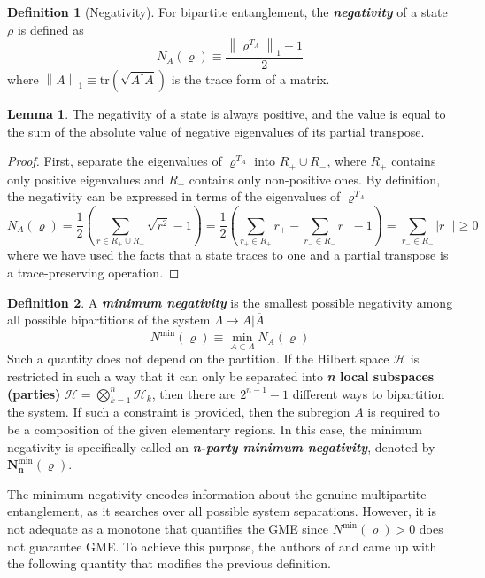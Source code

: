 \documentclass[12font]{article}
\theoremstyle{definition}
\newtheorem{definition}{Definition}[section]
\newtheorem{lemma}[theorem]{Lemma}
\newcommand{\lr}[1]{\left(  #1  \right)}
\newcommand{\abs}[1]{\left|  #1  \right|}
\newcommand{\mrm}[1]{\mathrm{#1}}
\newcommand{\tr}{\mrm{tr}}
\newcommand{\norm}[1]{\left\lVert#1\right\rVert}
\begin{document}
\begin{definition}[Negativity]\label{def:negativity}
    For bipartite entanglement, the \textbf{\textit{negativity}} of a state $\rho$ is defined as~\cite{Zyczkowski-Horodecki-Sanpera-Lewenstein_1998, Vidal-Werner_2002}
    \[
    N_A(\varrho) \equiv \frac{\norm{\varrho^{T_A}}_1 - 1}{2}
    \]
    where $\norm{A}_1 \equiv \tr \lr{\sqrt{A^\dagger A}}$ is the trace form of a matrix. 
\end{definition}

\begin{lemma}\label{lemma:neg-compute}
    The negativity of a state is always positive, and the value is equal to the sum of the absolute value of negative eigenvalues of its partial transpose.
\end{lemma}
\begin{proof}
    First, separate the eigenvalues of $\varrho^{T_A}$ into $R_{+} \cup R_{-}$, where $R_{+}$ contains only positive eigenvalues and $R_{-}$ contains only non-positive ones. By definition, the negativity can be expressed in terms of the eigenvalues of $\varrho^{T_A}$
    \[
    N_A(\varrho) = \frac{1}{2}\lr{\sum_{r \in R_+\cup R_-}\sqrt{r^2} - 1} = \frac{1}{2}\lr{\sum_{r_+\in R_+} r_+ - \sum_{r_-\in R_-} r_- - 1 } = \sum_{r_- \in R_-} \abs{r_-} \geq 0
    \]
    where we have used the facts that a state traces to one and a partial transpose is a trace-preserving operation.
\end{proof}

\begin{definition}
    A \textbf{\textit{minimum negativity}} is the smallest possible negativity among all possible bipartitions of the system $\Lambda \to A|\overline{A}$
    \[
    N^{\mrm{min}}(\varrho) \equiv \min_{A \subset \Lambda} N_A(\varrho)
    \]
    Such a quantity does not depend on the partition. If the Hilbert space $\mathcal{H}$ is restricted in such a way that it can only be separated into \textbf{\textit{n} local subspaces (parties)} $\mathcal{H} = \bigotimes_{k=1}^{n}\mathcal{H}_k$, then there are $2^{n-1} - 1$ different ways to bipartition the system. If such a constraint is provided, then the subregion $A$ is required to be a composition of the given elementary regions. In this case, the minimum negativity is specifically called an \textbf{\textit{n-party minimum negativity}}, denoted by $\boldsymbol{N^{\mrm{min}}_n(\varrho)}$. 
\end{definition}

The minimum negativity encodes information about the genuine multipartite entanglement, as it searches over all possible system separations. However, it is not adequate as a monotone that quantifies the GME since $N^{\mrm{min}}(\varrho) > 0$ does not guarantee GME. To achieve this purpose, the authors of \cite{Jungnitsch-Moroder-Guhne_2011} and \cite{Lyu-Chandorkar-Kapoor-Takei-Sorensen-Witczak-Krempa_2026} came up with the following quantity that modifies the previous definition.
\end{document}
